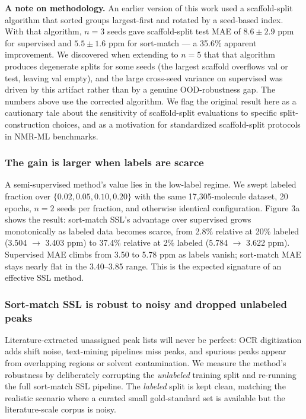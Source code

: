 \documentclass[
]{article}
\begin{document}
\textbf{A note on methodology.} An earlier version of this work used a
scaffold-split algorithm that sorted groups largest-first and rotated by
a seed-based index. With that algorithm, \(n=3\) seeds gave
scaffold-split test MAE of \(8.6 \pm 2.9\) ppm for supervised and
\(5.5 \pm 1.6\) ppm for sort-match --- a 35.6\% apparent improvement. We
discovered when extending to \(n=5\) that that algorithm produces
degenerate splits for some seeds (the largest scaffold overflows val or
test, leaving val empty), and the large cross-seed variance on
supervised was driven by this artifact rather than by a genuine
OOD-robustness gap. The numbers above use the corrected algorithm. We
flag the original result here as a cautionary tale about the sensitivity
of scaffold-split evaluations to specific split-construction choices,
and as a motivation for standardized scaffold-split protocols in NMR-ML
benchmarks.

\subsubsection{The gain is larger when labels are
scarce}\label{the-gain-is-larger-when-labels-are-scarce}

A semi-supervised method's value lies in the low-label regime. We swept
labeled fraction over \(\{0.02, 0.05, 0.10, 0.20\}\) with the same
17,305-molecule dataset, 20 epochs, \(n=2\) seeds per fraction, and
otherwise identical configuration. Figure 3a shows the result:
sort-match SSL's advantage over supervised grows monotonically as
labeled data becomes scarce, from 2.8\% relative at 20\% labeled (3.504
\(\rightarrow\) 3.403 ppm) to 37.4\% relative at 2\% labeled (5.784
\(\rightarrow\) 3.622 ppm). Supervised MAE climbs from 3.50 to 5.78 ppm
as labels vanish; sort-match MAE stays nearly flat in the 3.40--3.85
range. This is the expected signature of an effective SSL method.

\subsubsection{Sort-match SSL is robust to noisy and dropped unlabeled
peaks}\label{sort-match-ssl-is-robust-to-noisy-and-dropped-unlabeled-peaks}

Literature-extracted unassigned peak lists will never be perfect: OCR
digitization adds shift noise, text-mining pipelines miss peaks, and
spurious peaks appear from overlapping regions or solvent contamination.
We measure the method's robustness by deliberately corrupting the
\emph{unlabeled} training split and re-running the full sort-match SSL
pipeline. The \emph{labeled} split is kept clean, matching the realistic
scenario where a curated small gold-standard set is available but the
literature-scale corpus is noisy.
\end{document}
